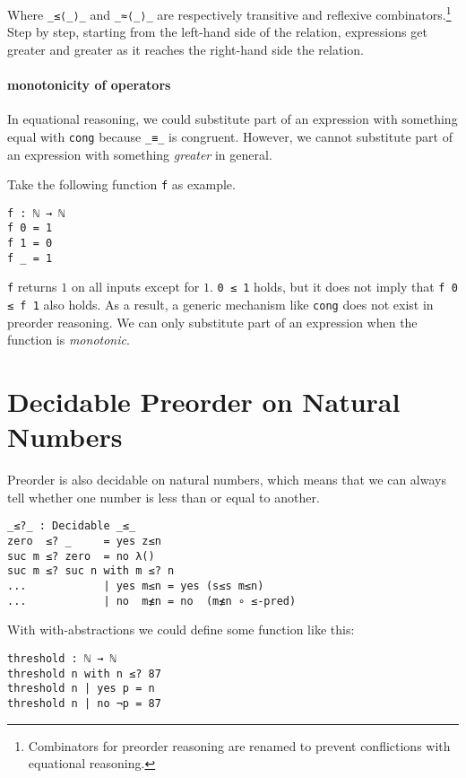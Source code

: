 \documentclass[../thesis.tex]{subfiles}
\begin{document}
Where {\lstinline|_≤⟨_⟩_|} and {\lstinline|_≈⟨_⟩_|} are respectively transitive
and reflexive combinators.\footnote{Combinators for preorder reasoning are
renamed to prevent conflictions with equational reasoning.}
Step by step, starting from the left-hand side of the relation, expressions get
greater and greater as it reaches the right-hand side the relation.

\paragraph{monotonicity of operators}

In equational reasoning, we could substitute part of an expression with something
equal with {\lstinline|cong|} because {\lstinline|_≡_|} is congruent.
However, we cannot substitute part of an expression with something \textit{greater}
in general.

Take the following function {\lstinline|f|} as example.

\begin{lstlisting}
f : ℕ → ℕ
f 0 = 1
f 1 = 0
f _ = 1
\end{lstlisting}

{\lstinline|f|} returns $ 1 $ on all inputs except for $ 1 $.
{\lstinline|0 ≤ 1|} holds, but it does not imply that {\lstinline|f 0 ≤ f 1|} also holds.
As a result, a generic mechanism like {\lstinline|cong|} does not exist in preorder reasoning.
We can only substitute part of an expression when the function is \textit{monotonic}.

\section{Decidable Preorder on Natural Numbers}

Preorder is also decidable on natural numbers, which means that we can always tell
whether one number is less than or equal to another.

\begin{lstlisting}
_≤?_ : Decidable _≤_
zero  ≤? _     = yes z≤n
suc m ≤? zero  = no λ()
suc m ≤? suc n with m ≤? n
...            | yes m≤n = yes (s≤s m≤n)
...            | no  m≰n = no  (m≰n ∘ ≤-pred)
\end{lstlisting}

With with-abstractions we could define some function like this:

\begin{lstlisting}
threshold : ℕ → ℕ
threshold n with n ≤? 87
threshold n | yes p = n
threshold n | no ¬p = 87
\end{lstlisting}
\end{document}
